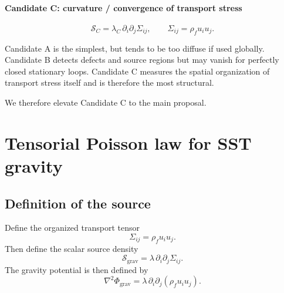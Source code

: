 \documentclass[11pt]{article}
\newcommand{\rhoF}{\rho_{\!f}}
\newcommand{\grav}{\mathrm{grav}}
\begin{document}
            \paragraph{Candidate C: curvature / convergence of transport stress}
                \begin{equation}
                    \mathcal{S}_C = \lambda_C\, \partial_i\partial_j \Sigma_{ij},
                    \qquad
                    \Sigma_{ij}=\rhoF u_i u_j.
                    \label{eq:SC}
                \end{equation}
                
                Candidate A is the simplest, but tends to be too diffuse if used globally. Candidate B detects defects and source regions but may vanish for perfectly closed stationary loops. Candidate C measures the spatial organization of transport stress itself and is therefore the most structural.
                
                We therefore elevate Candidate C to the main proposal.
        
        \section{Tensorial Poisson law for SST gravity}
        
        \subsection{Definition of the source}
            
            Define the organized transport tensor
            \begin{equation}
                \Sigma_{ij} = \rhoF u_i u_j.
                \label{eq:Sigmaij-repeat}
            \end{equation}
            Then define the scalar source density
            \begin{equation}
                \boxed{
                    \mathcal{S}_{\grav}
                    =
                    \lambda\, \partial_i\partial_j \Sigma_{ij}.
                }
                \label{eq:Sgrav-tensor}
            \end{equation}
            The gravity potential is then defined by
            \begin{equation}
                \boxed{
                    \nabla^2 \Phi_{\grav}
                    =
                    \lambda\,\partial_i\partial_j(\rhoF u_i u_j).
                }
                \label{eq:poisson-tensor}
            \end{equation}
        
\end{document}
